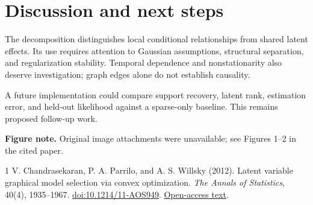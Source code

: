 \documentclass[11pt]{article}
\begin{document}
\section{Discussion and next steps}
The decomposition distinguishes local conditional relationships from shared
latent effects. Its use requires attention to Gaussian assumptions, structural
separation, and regularization stability. Temporal dependence and nonstationarity
also deserve investigation; graph edges alone do not establish causality.

A future implementation could compare support recovery, latent rank, estimation
error, and held-out likelihood against a sparse-only baseline. This remains
proposed follow-up work.

{\footnotesize\textbf{Figure note.} Original image attachments were unavailable;
see Figures 1--2 in the cited paper.}

\begin{thebibliography}{1}\small
{} V. Chandrasekaran, P. A. Parrilo, and A. S. Willsky (2012).
Latent variable graphical model selection via convex optimization.
\emph{The Annals of Statistics}, 40(4), 1935--1967.
\href{https://doi.org/10.1214/11-AOS949}{doi:10.1214/11-AOS949}.
\href{https://arxiv.org/html/1008.1290}{Open-access text}.
\end{thebibliography}
\end{document}
